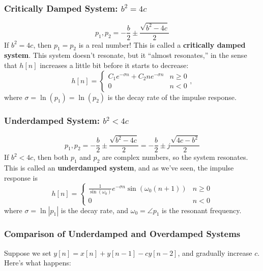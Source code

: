 \documentclass{beamer}
\begin{document}
\begin{frame}
  \frametitle{Critically Damped System: $b^2=4c$}
  
  \begin{displaymath}
    p_1,p_2 = -\frac{b}{2}\pm \frac{\sqrt{b^2-4c}}{2}
  \end{displaymath}
  If $b^2=4c$, then $p_1=p_2$ is a real number!  This is called a {\bf
    critically damped system}.  This system doesn't resonate, but it
  ``almost resonates,'' in the sense that $h[n]$ increases a little
  bit before it starts to decrease:
  \begin{displaymath}
    h[n] = \left\{\begin{array}{ll}
    C_1 e^{-\sigma n}+C_2n e^{-\sigma n}  & n \ge 0\\
    0 & n < 0
    \end{array}\right.,
  \end{displaymath}
  where $\sigma=\ln(p_1)=\ln(p_2)$ is the decay rate of the impulse
  response.
\end{frame}

\begin{frame}
  \frametitle{Underdamped System: $b^2<4c$}
  
  \begin{displaymath}
    p_1,p_2 = -\frac{b}{2}\pm \frac{\sqrt{b^2-4c}}{2}
    = -\frac{b}{2}\pm j\frac{\sqrt{4c-b^2}}{2}
  \end{displaymath}
  If $b^2<4c$, then both $p_1$ and $p_2$ are complex numbers, so the
  system resonates.  This is called an {\bf underdamped system}, and
  as we've seen, the impulse response is
  \begin{displaymath}
    h[n] = \left\{\begin{array}{ll}
    \frac{1}{\sin(\omega_0)}e^{-\sigma n}\sin(\omega_0(n+1)) & n\ge 0\\
    0 & n < 0
    \end{array}\right.
  \end{displaymath}
  where $\sigma=\ln|p_1|$ is the decay rate, and $\omega_0=\angle p_1$
  is the resonant frequency.
\end{frame}

\begin{frame}
  \frametitle{Comparison of Underdamped and Overdamped Systems}

  Suppose we set $y[n]=x[n]+y[n-1]-c y[n-2]$, and gradually
  increase $c$.  Here's what happens:
  \begin{center}
  \end{center}
\end{frame}
\end{document}
